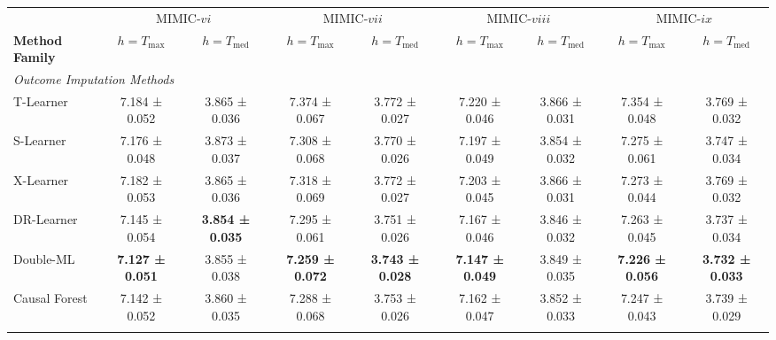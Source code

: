 \documentclass{article} %
\begin{document}
\begin{table}[!ht]
\begin{adjustbox}{angle=90,max height=0.95\textheight,center}
\begin{minipage}{\textheight}
    \begin{subtable}{\linewidth}
    \centering
    \begin{tabular}{l cc cc cc cc}
        \toprule
        & \multicolumn{2}{c}{MIMIC-$vi$} 
        & \multicolumn{2}{c}{MIMIC-$vii$}
        & \multicolumn{2}{c}{MIMIC-$viii$}
        & \multicolumn{2}{c}{MIMIC-$ix$} \\
        \cmidrule(lr){2-3}
        \cmidrule(lr){4-5}
        \cmidrule(lr){6-7}
        \cmidrule(lr){8-9}
        \textbf{Method Family} 
        & $h=T_{\max}$ & $h=T_{\text{med}}$
        & $h=T_{\max}$ & $h=T_{\text{med}}$
        & $h=T_{\max}$ & $h=T_{\text{med}}$
        & $h=T_{\max}$ & $h=T_{\text{med}}$ \\ \midrule
        \multicolumn{7}{l}{\textit{Outcome Imputation Methods}} \\
        T-Learner & 7.184 ± 0.052 & 3.865 ± 0.036 & 7.374 ± 0.067 & 3.772 ± 0.027 & 7.220 ± 0.046 & 3.866 ± 0.031 & 7.354 ± 0.048 & 3.769 ± 0.032 \\ 
        S-Learner & 7.176 ± 0.048 & 3.873 ± 0.037 & 7.308 ± 0.068 & 3.770 ± 0.026 & 7.197 ± 0.049 & 3.854 ± 0.032 & 7.275 ± 0.061 & 3.747 ± 0.034 \\ 
        X-Learner & 7.182 ± 0.053 & 3.865 ± 0.036 & 7.318 ± 0.069 & 3.772 ± 0.027 & 7.203 ± 0.045 & 3.866 ± 0.031 & 7.273 ± 0.044 & 3.769 ± 0.032 \\ 
        DR-Learner & 7.145 ± 0.054 & \textbf{3.854 ± 0.035} & 7.295 ± 0.061 & 3.751 ± 0.026 & 7.167 ± 0.046 & 3.846 ± 0.032 & 7.263 ± 0.045 & 3.737 ± 0.034 \\
        Double-ML & \textbf{7.127 ± 0.051} & 3.855 ± 0.038 & \textbf{7.259 ± 0.072} & \textbf{3.743 ± 0.028} & \textbf{7.147 ± 0.049} & 3.849 ± 0.035 & \textbf{7.226 ± 0.056} & \textbf{3.732 ± 0.033} \\
        Causal Forest & 7.142 ± 0.052 & 3.860 ± 0.035 & 7.288 ± 0.068 & 3.753 ± 0.026 & 7.162 ± 0.047 & 3.852 ± 0.033 & 7.247 ± 0.043 & 3.739 ± 0.029 \\ 
        \addlinespace
        \multicolumn{7}{l}{\textit{Direct-Survival CATE Methods}} \\

\end{tabular}
\end{subtable}
\end{minipage}
\end{adjustbox}
\end{table}
\end{document}
